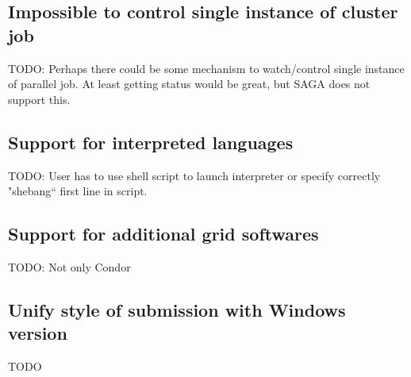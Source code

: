 \documentclass[a4paper,10pt,twocolumn]{article}
\begin{document}
\subsection{Impossible to control single instance of cluster job}

TODO: Perhaps there could be some mechanism to watch/control single instance of parallel job. At least getting status would be great, but SAGA does not support this.

\subsection{Support for interpreted languages}

TODO: User has to use shell script to launch interpreter or specify correctly "shebang`` first line in script.

\subsection{Support for additional grid softwares}

TODO: Not only Condor

\subsection{Unify style of submission with Windows version}

TODO



\end{document}
